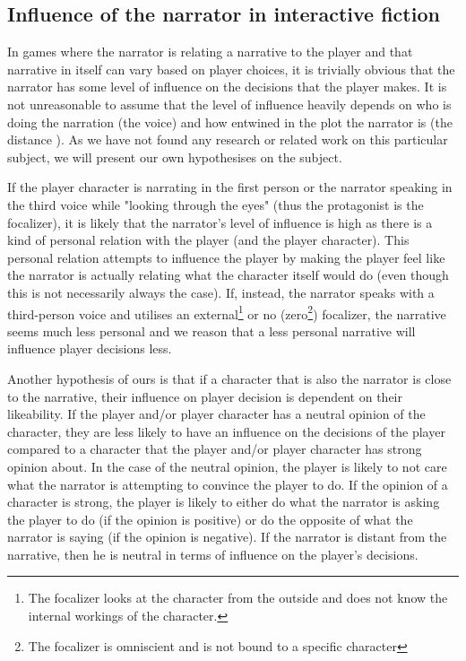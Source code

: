 \subsection{Influence of the narrator in interactive fiction}
In games where the narrator is relating a narrative to the player and that narrative in itself can vary based on player choices, it is trivially obvious that the narrator has some level of influence on the decisions that the player makes. It is not unreasonable to assume that the level of influence heavily depends on who is doing the narration (the voice\cite[p. 70]{Abbot}) and how entwined in the plot the narrator is (the distance \cite[p. 74]{Abbot}). As we have not found any research or related work on this particular subject, we will present our own hypothesises on the subject.

If the player character is narrating in the first person or the narrator speaking in the third voice while "looking through the eyes" (thus the protagonist is the focalizer\cite[p. 73]{Abbot}), it is likely that the narrator's level of influence is high as there is a kind of personal relation with the player (and the player character). This personal relation attempts to influence the player by making the player feel like the narrator is actually relating what the character itself would do (even though this is not necessarily always the case). If, instead, the narrator speaks with a third-person voice and utilises an external\footnote{The focalizer looks at the character from the outside and does not know the internal workings of the character.} or no (zero\footnote{The focalizer is omniscient and is not bound to a specific character}) focalizer, the narrative seems much less personal and we reason that a less personal narrative will influence player decisions less.

Another hypothesis of ours is that if a character that is also the narrator is close to the narrative, their influence on player decision is dependent on their likeability. If the player and/or player character has a neutral opinion of the character, they are less likely to have an influence on the decisions of the player compared to a character that the player and/or player character has strong opinion about. In the case of the neutral opinion, the player is likely to not care what the narrator is attempting to convince the player to do. If the opinion of a character is strong, the player is likely to either do what the narrator is asking the player to do (if the opinion is positive) or do the opposite of what the narrator is saying (if the opinion is negative). If the narrator is distant from the narrative, then he is neutral in terms of influence on the player's decisions.